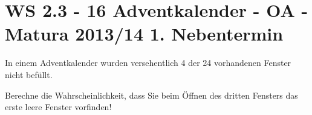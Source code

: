 \section{WS 2.3 - 16 Adventkalender - OA - Matura 2013/14 1. Nebentermin}

\begin{beispiel}[WS 2.3]{1} %
				In einem Adventkalender wurden versehentlich 4 der 24 vorhandenen Fenster nicht befüllt.

Berechne die Wahrscheinlichkeit, dass Sie beim Öffnen des dritten Fensters das erste leere Fenster vorfinden!\leer

\end{beispiel}